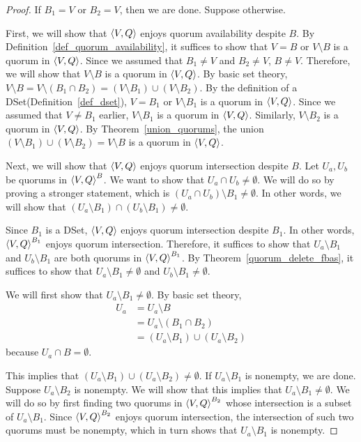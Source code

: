 \documentclass[12pt, psamsfonts]{amsart}
\theoremstyle{definition}
\theoremstyle{remark}
\numberwithin{equation}{section}
\begin{document}
\begin{proof}
	If $B_1 = V$ or $B_2 = V$, then we are done.
	Suppose otherwise.

    First, we will show that $\ev{V, Q}$ enjoys quorum availability despite $B$.
    By Definition~\ref{def_quorum_availability}, it suffices to show that $V = B$ or $V \setminus B$ is a quorum in $\ev{V, Q}$.
    Since we assumed that $B_1 \ne V$ and $B_2 \ne V$, $B \ne V$.
    Therefore, we will show that $V \setminus B$ is a quorum in $\ev{V, Q}$.
    By basic set theory, $V \setminus B = V \setminus (B_1 \cap B_2) = (V \setminus B_1) \cup (V \setminus B_2)$.
    By the definition of a DSet(Definition~\ref{def_dset}), $V = B_1$ or $V \setminus B_1$ is a quorum in $\ev{V, Q}$.
    Since we assumed that $V \ne B_1$ earlier, $V \setminus B_1$ is a quorum in $\ev{V, Q}$.
    Similarly, $V \setminus B_2$ is a quorum in $\ev{V, Q}$.
    By Theorem~\ref{union_quorums}, the union $(V \setminus B_1) \cup (V \setminus B_2) = V \setminus B$ is a quorum in $\ev{V, Q}$.

    Next, we will show that $\ev{V, Q}$ enjoys quorum intersection despite $B$.
	Let $U_a, U_b$ be quorums in $\ev{V, Q}^B$.
    We want to show that $U_a \cap U_b \ne \emptyset$.
    We will do so by proving a stronger statement, which is $(U_a \cap U_b) \setminus B_1 \ne \emptyset$.
    In other words, we will show that $(U_a \setminus B_1) \cap (U_b \setminus B_1) \ne \emptyset$.

    Since $B_1$ is a DSet, $\ev{V, Q}$ enjoys quorum intersection despite $B_1$.
    In other words, $\ev{V, Q}^{B_1}$ enjoys quorum intersection.
    Therefore, it suffices to show that $U_a \setminus B_1$ and $U_b \setminus B_1$ are both quorums in $\ev{V, Q}^{B_1}$.
    By Theorem~\ref{quorum_delete_fbas}, it suffices to show that $U_a \setminus B_1 \ne \emptyset$ and $U_b \setminus B_1 \ne \emptyset$.
    
    We will first show that $U_a \setminus B_1 \ne \emptyset$.
    By basic set theory,
	\begin{align*}
        U_a &= U_a \setminus B \\
            &= U_a \setminus (B_1 \cap B_2) \\
            &= (U_a \setminus B_1) \cup (U_a \setminus B_2)
	\end{align*}
	because $U_a \cap B = \emptyset$.

	This implies that $(U_a \setminus B_1) \cup (U_a \setminus B_2) \ne \emptyset$.
    If $U_a \setminus B_1$ is nonempty, we are done.
    Suppose $U_a \setminus B_2$ is nonempty.
    We will show that this implies that $U_a \setminus B_1 \ne \emptyset$.
    We will do so by first finding two quorums in $\ev{V, Q}^{B_2}$ whose intersection is a subset of $U_a \setminus B_1$.
	Since $\ev{V, Q}^{B_2}$ enjoys quorum intersection, the intersection of such two quorums must be nonempty, which in turn shows that $U_a \setminus B_1$ is nonempty.


\end{proof}
\end{document}
